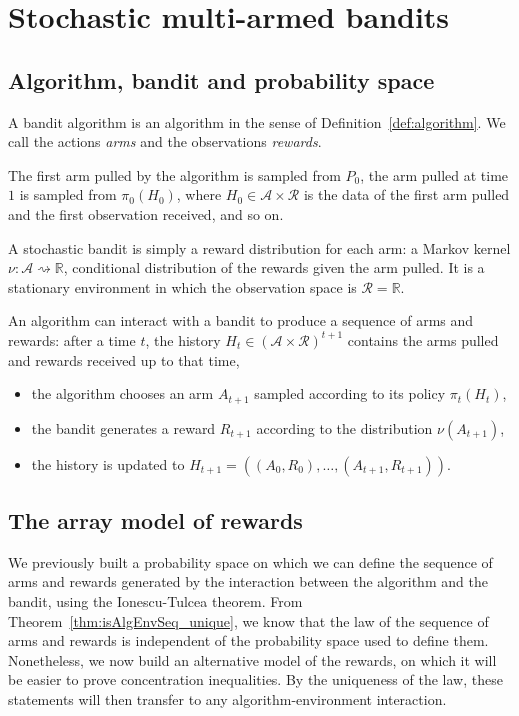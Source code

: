 \chapter{Stochastic multi-armed bandits}

\section{Algorithm, bandit and probability space}

A bandit algorithm is an algorithm in the sense of Definition~\ref{def:algorithm}.
We call the actions \emph{arms} and the observations \emph{rewards}.

The first arm pulled by the algorithm is sampled from $P_0$, the arm pulled at time $1$ is sampled from $\pi_0(H_0)$, where $H_0 \in \mathcal{A} \times \mathcal{R}$ is the data of the first arm pulled and the first observation received, and so on.


\begin{definition}[Bandit]\label{def:bandit}
  \leanok
A stochastic bandit is simply a reward distribution for each arm: a Markov kernel $\nu : \mathcal{A} \rightsquigarrow \mathbb{R}$, conditional distribution of the rewards given the arm pulled.
It is a stationary environment in which the observation space is $\mathcal{R} = \mathbb{R}$.
\end{definition}

An algorithm can interact with a bandit to produce a sequence of arms and rewards: after a time $t$, the history $H_t \in (\mathcal{A} \times \mathcal{R})^{t+1}$ contains the arms pulled and rewards received up to that time,
\begin{itemize}
  \item the algorithm chooses an arm $A_{t+1}$ sampled according to its policy $\pi_t(H_t)$,
  \item the bandit generates a reward $R_{t+1}$ according to the distribution $\nu(A_{t+1})$,
  \item the history is updated to $H_{t+1} = ((A_0, R_0), \ldots, (A_{t+1}, R_{t+1}))$.
\end{itemize}


\section{The array model of rewards}

We previously built a probability space on which we can define the sequence of arms and rewards generated by the interaction between the algorithm and the bandit, using the Ionescu-Tulcea theorem.
From Theorem~\ref{thm:isAlgEnvSeq_unique}, we know that the law of the sequence of arms and rewards is independent of the probability space used to define them.
Nonetheless, we now build an alternative model of the rewards, on which it will be easier to prove concentration inequalities.
By the uniqueness of the law, these statements will then transfer to any algorithm-environment interaction.

